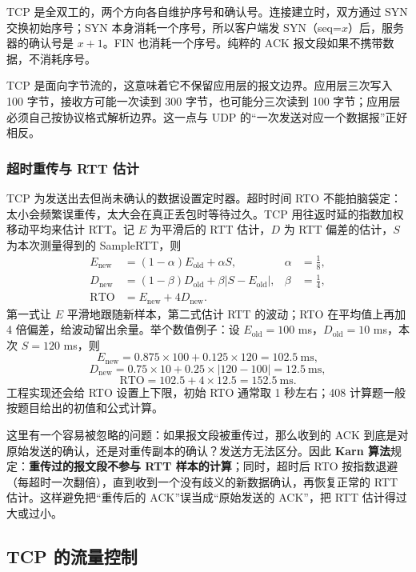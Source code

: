 TCP 是全双工的，两个方向各自维护序号和确认号。连接建立时，双方通过 SYN 交换初始序号；SYN 本身消耗一个序号，所以客户端发 SYN（seq=$x$）后，服务器的确认号是 $x+1$。FIN 也消耗一个序号。纯粹的 ACK 报文段如果不携带数据，不消耗序号。

TCP 是面向字节流的，这意味着它不保留应用层的报文边界。应用层三次写入 100 字节，接收方可能一次读到 300 字节，也可能分三次读到 100 字节；应用层必须自己按协议格式解析边界。这一点与 UDP 的“一次发送对应一个数据报”正好相反。

\subsubsection{超时重传与 RTT 估计}

TCP 为发送出去但尚未确认的数据设置定时器。超时时间 RTO 不能拍脑袋定：太小会频繁误重传，太大会在真正丢包时等待过久。TCP 用往返时延的指数加权移动平均来估计 RTT。记 $E$ 为平滑后的 RTT 估计，$D$ 为 RTT 偏差的估计，$S$ 为本次测量得到的 SampleRTT，则
\begin{align}
E_{\mathrm{new}}&=(1-\alpha)E_{\mathrm{old}}+\alpha S, & \alpha&=\frac18,\\
D_{\mathrm{new}}&=(1-\beta)D_{\mathrm{old}}+\beta\lvert S-E_{\mathrm{old}}\rvert, & \beta&=\frac14,\\
\mathrm{RTO}&=E_{\mathrm{new}}+4D_{\mathrm{new}}. &&
\end{align}
第一式让 $E$ 平滑地跟随新样本，第二式估计 RTT 的波动；RTO 在平均值上再加 4 倍偏差，给波动留出余量。举个数值例子：设 $E_{\mathrm{old}}=100$ ms，$D_{\mathrm{old}}=10$ ms，本次 $S=120$ ms，则
\[
E_{\mathrm{new}}=0.875\times100+0.125\times120=102.5\ \mathrm{ms},
\]
\[
D_{\mathrm{new}}=0.75\times10+0.25\times|120-100|=12.5\ \mathrm{ms},
\]
\[
\mathrm{RTO}=102.5+4\times12.5=152.5\ \mathrm{ms}.
\]
工程实现还会给 RTO 设置上下限，初始 RTO 通常取 1 秒左右；408 计算题一般按题目给出的初值和公式计算。

这里有一个容易被忽略的问题：如果报文段被重传过，那么收到的 ACK 到底是对原始发送的确认，还是对重传副本的确认？发送方无法区分。因此 \textbf{Karn 算法}规定：\textbf{重传过的报文段不参与 RTT 样本的计算}；同时，超时后 RTO 按指数退避（每超时一次翻倍），直到收到一个没有歧义的新数据确认，再恢复正常的 RTT 估计。这样避免把“重传后的 ACK”误当成“原始发送的 ACK”，把 RTT 估计得过大或过小。

\subsection{TCP 的流量控制}

